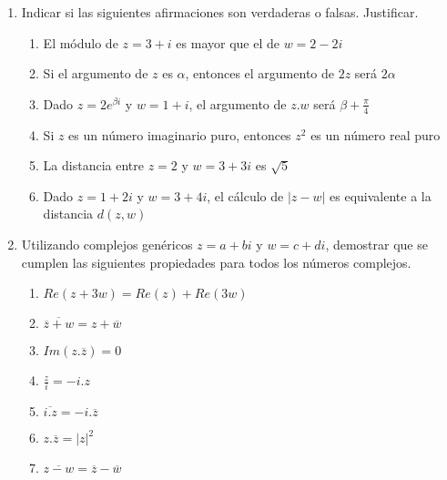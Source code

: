 \documentclass[a4paper]{article}
\newcommand{\exercise}{\item}
\newcommand{\df}[2]{\displaystyle\frac{#1}{#2}}
\newcommand{\conj}[1]{\overline{#1}}
\begin{document}
\begin{enumerate}
\begin{multicols}{2}
\begin{enumerate} [label=(\alph*)]
		\item $\df{(1+i)^4}{(-1-i)^6}$
		\item $\sqrt[3]{2\sqrt{3}+2i}$ (las raíces cúbicas de $2\sqrt{3}+2i$)
		\item $\sqrt[5]{-\sqrt{3}i-1}$ (las raíces quintas de $-\sqrt{3}i-1$)
		\item $\sqrt[4]{-\df{\sqrt{3}}{2}i+\df{1}{2}}$ (las raíces cuartas de $-\df{\sqrt{3}}{2}i+\df{1}{2}$)
		\item $\sqrt[3]{-1-i\sqrt{3}}$ (las raíces cúbicas de $-1-i\sqrt{3}$)
		\item $\sqrt[5]{-1+\sqrt{3}i}$ (las raíces quintas de $-1+\sqrt{3}i$)
	\end{enumerate}
	\end{multicols}
	\exercise Indicar si las siguientes afirmaciones son verdaderas o falsas. Justificar.
	\begin{enumerate} [label=(\alph*)]
		\item El módulo de $z=3+i$ es mayor que el de $w=2-2i$
		\item Si el argumento de $z$ es $\alpha$, entonces el argumento de $2z$ será $2\alpha$
		\item Dado $z=2e^{\beta i}$ y $w=1+i$, el argumento de $z.w$ será $\beta+\df{\pi}{4}$
		\item Si $z$ es un número imaginario puro, entonces $z^2$ es un número real puro
		\item La distancia entre $z=2$ y $w=3+3i$ es $\sqrt{5}$
		\item Dado $z=1+2i$ y $w=3+4i$, el cálculo de $|z-w|$ es equivalente a la distancia $d(z,w)$
	\end{enumerate}
	\exercise Utilizando complejos genéricos $z=a+bi$ y $w=c+di$, demostrar que se cumplen las siguientes propiedades para todos los números complejos.
	\begin{multicols}{2}
	\begin{enumerate} [label=(\alph*)]
		\item $Re(z+3w)=Re(z)+Re(3w)$
		\item $\conj{\conj{z}+w}=z+\conj{w}$
		\item $Im(z.\conj{z})=0$
		\item $\df{z}{i}=-i.z$
		\item $\conj{i.z}=-i.\conj{z}$
		\item $z.\conj{z}=|z|^2$
		\item $\conj{z-w}=\conj{z}-\conj{w}$

\end{enumerate}
\end{multicols}
\end{enumerate}
\end{document}
